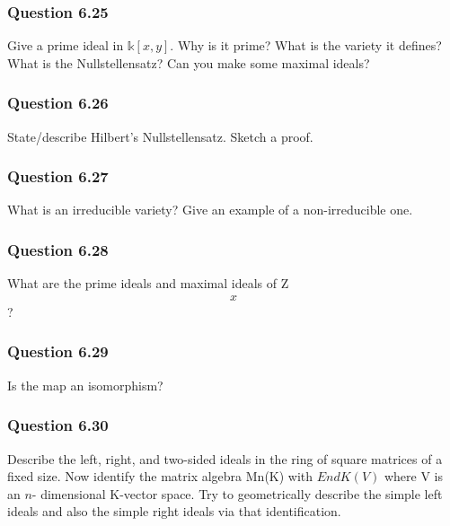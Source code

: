 \hypertarget{question-6.25}{%
\subsubsection{Question 6.25}\label{question-6.25}}

Give a prime ideal in \({\mathbb{k}}[x, y]\). Why is it prime? What is
the variety it defines? What is the Nullstellensatz? Can you make some
maximal ideals?

\hypertarget{question-6.26}{%
\subsubsection{Question 6.26}\label{question-6.26}}

State/describe Hilbert's Nullstellensatz. Sketch a proof.

\hypertarget{question-6.27}{%
\subsubsection{Question 6.27}\label{question-6.27}}

What is an irreducible variety? Give an example of a non-irreducible
one.

\hypertarget{question-6.28}{%
\subsubsection{Question 6.28}\label{question-6.28}}

What are the prime ideals and maximal ideals of Z
\begin{align*}x\end{align*}
?

\hypertarget{question-6.29}{%
\subsubsection{Question 6.29}\label{question-6.29}}

Is the map  an isomorphism?

\hypertarget{question-6.30}{%
\subsubsection{Question 6.30}\label{question-6.30}}

Describe the left, right, and two-sided ideals in the ring of square
matrices of a fixed size. Now identify the matrix algebra Mn(K) with
\(EndK(V )\) where V is an \(n\)- dimensional K-vector space. Try to
geometrically describe the simple left ideals and also the simple right
ideals via that identification.

